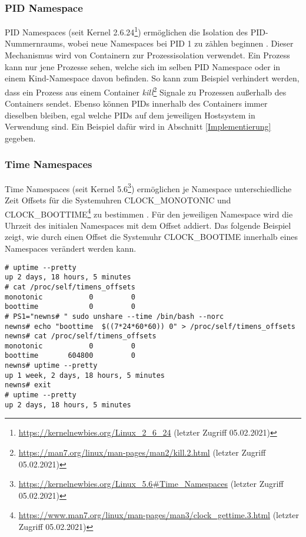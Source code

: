 \subsubsection{PID Namespace}
PID Namespaces (seit Kernel
2.6.24\footnote{\url{https://kernelnewbies.org/Linux_2_6_24} (letzter Zugriff
05.02.2021)}) ermöglichen die Isolation des  PID-Nummern\-raums, wobei neue
Namespaces bei PID 1 zu zählen beginnen \cite{man_pid_namespaces}. Dieser
Mechanismus wird von Containern zur Prozessisolation verwendet. Ein Prozess
kann nur jene Prozesse sehen, welche sich im selben PID Namespace oder in einem
Kind-Namespace davon befinden. So kann zum Beispiel verhindert werden, dass ein
Prozess aus einem Container
\emph{kill}\footnote{\url{https://man7.org/linux/man-pages/man2/kill.2.html} (letzter
Zugriff 05.02.2021)} Signale zu Prozessen au{\ss}erhalb des Containers sendet.
Ebenso können PIDs innerhalb des Containers immer dieselben bleiben, egal
welche PIDs auf dem jeweiligen Hostsystem in Verwendung sind. Ein Beispiel
dafür wird in Abschnitt \ref{Implementierung} gegeben.

\subsubsection{Time Namespaces}
Time Namespaces (seit Kernel
5.6\footnote{\url{https://kernelnewbies.org/Linux_5.6\#Time_Namespaces}
(letzter Zugriff 05.02.2021)}) ermöglichen je Namespace unterschiedliche Zeit
Offsets für die Systemuhren CLOCK\_MONOTONIC und
CLOCK\_BOOTTIME\footnote{\url{https://www.man7.org/linux/man-pages/man3/clock_gettime.3.html}
(letzter Zugriff 05.02.2021)} zu bestimmen \cite{man_time_namespaces}. Für den
jeweiligen Namespace wird die Uhrzeit des initialen Namespaces mit dem Offset
addiert. Das folgende Beispiel zeigt, wie durch einen Offset die Systemuhr
CLOCK\_BOOTIME innerhalb eines Namespaces verändert werden kann. 

\begin{lstlisting}[label={console:time_namespace},caption={Beispiel für Time Namespace}]
# uptime --pretty
up 2 days, 18 hours, 5 minutes
# cat /proc/self/timens_offsets
monotonic           0         0
boottime            0         0
# PS1="newns# " sudo unshare --time /bin/bash --norc
newns# echo "boottime  $((7*24*60*60)) 0" > /proc/self/timens_offsets
newns# cat /proc/self/timens_offsets
monotonic           0         0
boottime       604800         0
newns# uptime --pretty
up 1 week, 2 days, 18 hours, 5 minutes
newns# exit
# uptime --pretty
up 2 days, 18 hours, 5 minutes
\end{lstlisting}

